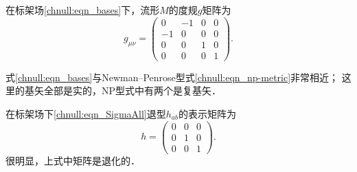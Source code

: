 在标架场\eqref{chnull:eqn_bases}下，流形$M$的度规$g$矩阵为
\begin{equation}\label{chnull:eqn_gab}
    g_{\mu\nu}=\begin{pmatrix}
        0& -1&0 &0 \\ -1& 0&0 &0 \\ 
        0&0& 1&0 \\0&0& 0 & 1
    \end{pmatrix}.
\end{equation}

式\eqref{chnull:eqn_bases}与Newman--Penrose型式\eqref{chnull:eqn_np-metric}非常相近；
这里的基矢全部是实的，NP型式中有两个是复基矢．



在标架场下\eqref{chnull:eqn_SigmaAll}退型$h_{ab}$的表示矩阵为
\begin{equation}\label{chnull:eqn_hij}
    h=\begin{pmatrix}
        0&0&0 \\ 0& 1 &0 \\0& 0 & 1
    \end{pmatrix}.
\end{equation}
很明显，上式中矩阵是退化的．




